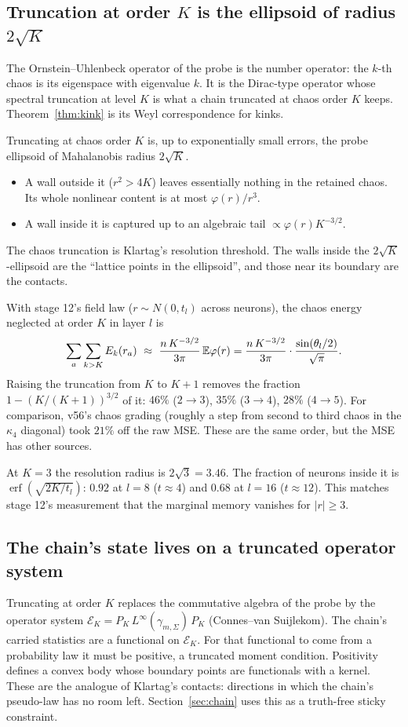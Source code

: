 \subsection{Truncation at order $K$ is the ellipsoid of radius $2\sqrt K$}
The Ornstein--Uhlenbeck operator of the probe is the number operator: the $k$-th chaos is its eigenspace with eigenvalue $k$. It is
the Dirac-type operator whose spectral truncation at level $K$ is what a chain truncated at chaos order $K$ keeps.
Theorem~\ref{thm:kink} is its Weyl correspondence for kinks.
\begin{corollary}\label{cor:resell}
Truncating at chaos order $K$ is, up to exponentially small errors, the probe ellipsoid of Mahalanobis radius $2\sqrt K$.
\begin{itemize}[leftmargin=*]
\item A wall outside it ($r^2>4K$) leaves essentially nothing in the retained chaos. Its whole nonlinear content is at most $\varphi(r)/r^3$.
\item A wall inside it is captured up to an algebraic tail $\propto\varphi(r)K^{-3/2}$.
\end{itemize}
The chaos truncation is Klartag's resolution threshold. The walls inside the $2\sqrt K$-ellipsoid are the ``lattice points in the
ellipsoid'', and those near its boundary are the contacts.
\end{corollary}
\begin{corollary}
With stage 12's field law ($r\sim N(0,t_l)$ across neurons), the chaos energy neglected at order $K$ in layer $l$ is
\[
\sum_a\sum_{k>K}E_k(r_a)\ \approx\ \frac{n\,K^{-3/2}}{3\pi}\,\E\varphi(r)=\frac{n\,K^{-3/2}}{3\pi}\cdot\frac{\sin(\theta_l/2)}{\sqrt\pi}.
\]
Raising the truncation from $K$ to $K+1$ removes the fraction $1-(K/(K+1))^{3/2}$ of it: $46\%$ ($2\to3$), $35\%$ ($3\to4$),
$28\%$ ($4\to5$). For comparison, v56's chaos grading (roughly a step from second to third chaos in the $\kappa_4$ diagonal) took $21\%$ off the raw MSE. These are the same
order, but the MSE has other sources.
\end{corollary}
At $K=3$ the resolution radius is $2\sqrt3=3.46$. The fraction of neurons inside it is $\operatorname{erf}(\sqrt{2K/t_l})$: $0.92$ at $l=8$ ($t\approx4$) and
$0.68$ at $l=16$ ($t\approx12$). This matches stage 12's measurement that the marginal memory vanishes for $|r|\ge3$.

\subsection{The chain's state lives on a truncated operator system}
Truncating at order $K$ replaces the commutative algebra of the probe by the operator system $\mathcal E_K=P_K\,L^\infty(\gamma_{m,\Sigma})\,P_K$
(Connes--van Suijlekom). The chain's carried statistics are a functional on $\mathcal E_K$. For that functional to come from a probability
law it must be positive, a truncated moment condition. Positivity defines a convex body whose boundary points are functionals with a
kernel. These are the analogue of Klartag's contacts: directions in which the chain's pseudo-law has no room left. Section~\ref{sec:chain}
uses this as a truth-free sticky constraint.
